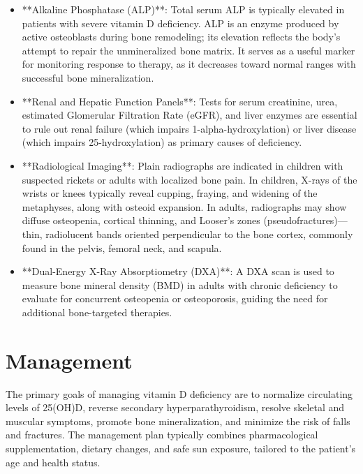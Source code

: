 \begin{itemize}
    \item **Alkaline Phosphatase (ALP)**: Total serum ALP is typically elevated in patients with severe vitamin D deficiency. ALP is an enzyme produced by active osteoblasts during bone remodeling; its elevation reflects the body's attempt to repair the unmineralized bone matrix. It serves as a useful marker for monitoring response to therapy, as it decreases toward normal ranges with successful bone mineralization.
    \item **Renal and Hepatic Function Panels**: Tests for serum creatinine, urea, estimated Glomerular Filtration Rate (eGFR), and liver enzymes are essential to rule out renal failure (which impairs 1-alpha-hydroxylation) or liver disease (which impairs 25-hydroxylation) as primary causes of deficiency.
    \item **Radiological Imaging**: Plain radiographs are indicated in children with suspected rickets or adults with localized bone pain. In children, X-rays of the wrists or knees typically reveal cupping, fraying, and widening of the metaphyses, along with osteoid expansion. In adults, radiographs may show diffuse osteopenia, cortical thinning, and Looser's zones (pseudofractures)—thin, radiolucent bands oriented perpendicular to the bone cortex, commonly found in the pelvis, femoral neck, and scapula.
    \item **Dual-Energy X-Ray Absorptiometry (DXA)**: A DXA scan is used to measure bone mineral density (BMD) in adults with chronic deficiency to evaluate for concurrent osteopenia or osteoporosis, guiding the need for additional bone-targeted therapies.
\end{itemize}

\section*{Management}
The primary goals of managing vitamin D deficiency are to normalize circulating levels of 25(OH)D, reverse secondary hyperparathyroidism, resolve skeletal and muscular symptoms, promote bone mineralization, and minimize the risk of falls and fractures. The management plan typically combines pharmacological supplementation, dietary changes, and safe sun exposure, tailored to the patient's age and health status.

